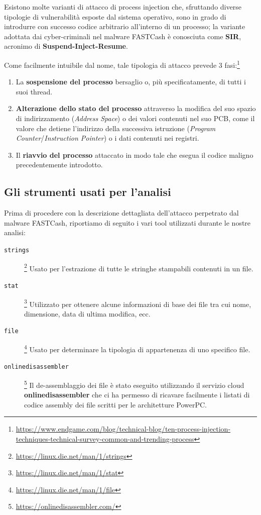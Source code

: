 \documentclass[10pt,a4paper, titlepage]{report}
\begin{document}
Esistono molte varianti di attacco di process injection che, sfruttando diverse tipologie di vulnerabilità esposte dal sistema operativo, sono in grado di introdurre con successo codice arbitrario all'interno di un processo; la variante adottata dai cyber-criminali nel malware FASTCash è conosciuta come \textbf{SIR}, acronimo di \textbf{Suspend-Inject-Resume}.

Come facilmente intuibile dal nome, tale tipologia di attacco prevede 3 fasi:\footnote{\url{https://www.endgame.com/blog/technical-blog/ten-process-injection-techniques-technical-survey-common-and-trending-process}}
\begin{enumerate}
\item La \textbf{sospensione del processo} bersaglio o, più specificatamente, di tutti i suoi thread. 
\item \textbf{Alterazione dello stato del processo} attraverso la modifica del suo spazio di indirizzamento (\textit{Address Space}) o dei valori contenuti nel suo PCB, come il valore che detiene l'indirizzo della successiva istruzione (\textit{Program Counter}/\textit{Instruction Pointer}) o i dati contenuti nei registri.
\item Il \textbf{riavvio del processo} attaccato in modo tale che esegua il codice maligno precedentemente introdotto.
\end{enumerate}

\subsection{Gli strumenti usati per l'analisi}

Prima di procedere con la descrizione dettagliata dell'attacco perpetrato dal malware FASTCash, riportiamo di seguito i vari tool utilizzati durante le nostre analisi:

\begin{description}
\item[\texttt{strings}]\footnote{\url{https://linux.die.net/man/1/strings}} Usato per l'estrazione di tutte le stringhe stampabili contenuti in un file.
\item[\texttt{stat}]\footnote{\url{https://linux.die.net/man/1/stat}} Utilizzato per ottenere alcune informazioni di base dei file tra cui nome, dimensione, data di ultima modifica, ecc.
\item[\texttt{file}]\footnote{\url{https://linux.die.net/man/1/file}} Usato per determinare la tipologia di appartenenza di uno specifico file.
\item[\texttt{onlinedisassembler}]\footnote{\url{https://onlinedisassembler.com/}} Il de-assemblaggio dei file è stato eseguito utilizzando il servizio cloud \textbf{onlinedisassembler} che ci ha permesso di ricavare facilmente i listati di codice assembly dei file scritti per le architetture PowerPC\texttrademark.
\end{description}
\end{document}
